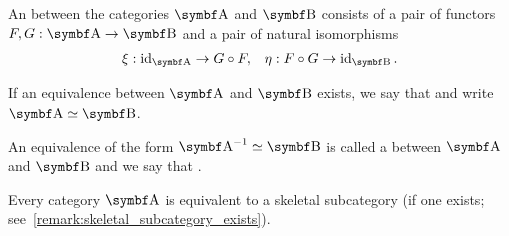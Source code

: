 \begin{definition}\label{def:category_equivalence}\cite[definition 1.3.15]{Leinster2014}
  An  between the categories \( \Bold A \) and \( \Bold B \) consists of a pair of functors \( F, G: \Bold A \to \Bold B \) and a pair of natural isomorphisms
  \begin{align*}
    \xi: \Id_{\Bold A} \to G \circ F,
    &&
    \eta: F \circ G \to \Id_{\Bold B}.
  \end{align*}

  If an equivalence between \( \Bold A \) and \( \Bold B \) exists, we say that  and write \( \Bold A \simeq \Bold B \).

  An equivalence of the form \( \Cat{A}^{-1} \simeq \Bold{B} \) is called a  between \( \Bold A \) and \( \Bold B \) and we say that  \cite[example 1.3.22]{Leinster2014}.
\end{definition}

\begin{proposition}\label{thm:skeletal_subcategory_equivalence}\cite[91]{MacLane1994}
  Every category \( \Bold A \) is equivalent to a skeletal subcategory (if one exists; see~\cref{remark:skeletal_subcategory_exists}).
\end{proposition}


